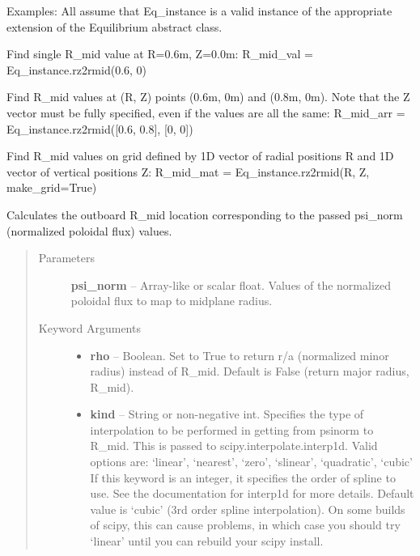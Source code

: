 \documentclass[letterpaper,10pt,english]{sphinxmanual}
\begin{document}
\begin{fulllineitems}
\begin{fulllineitems}
\begin{quote}
\begin{description}
\end{description}\end{quote}

Examples:
All assume that Eq\_instance is a valid instance of the appropriate
extension of the Equilibrium abstract class.

Find single R\_mid value at R=0.6m, Z=0.0m:
R\_mid\_val = Eq\_instance.rz2rmid(0.6, 0)

Find R\_mid values at (R, Z) points (0.6m, 0m) and (0.8m, 0m).
Note that the Z vector must be fully specified,
even if the values are all the same:
R\_mid\_arr = Eq\_instance.rz2rmid({[}0.6, 0.8{]}, {[}0, 0{]})

Find R\_mid values on grid defined by 1D vector of radial positions R
and 1D vector of vertical positions Z:
R\_mid\_mat = Eq\_instance.rz2rmid(R, Z, make\_grid=True)

\end{fulllineitems}


\begin{fulllineitems}
\label{eqtools:eqtools.eqdskreader.EqdskReader.psinorm2rmid}
Calculates the outboard R\_mid location corresponding to the passed psi\_norm (normalized poloidal flux) values.
\begin{quote}\begin{description}
\item[{Parameters }] \leavevmode
\textbf{psi\_norm} --
Array-like or scalar float. Values of the normalized
poloidal flux to map to midplane radius.

\item[{Keyword Arguments}] \leavevmode\begin{itemize}
\item {} 
\textbf{rho} --
Boolean. Set to True to return r/a (normalized minor radius)
instead of R\_mid. Default is False (return major radius, R\_mid).

\item {} 
\textbf{kind} --
String or non-negative int. Specifies the type of interpolation
to be performed in getting from psinorm to R\_mid. This is
passed to scipy.interpolate.interp1d. Valid options are:
`linear', `nearest', `zero', `slinear', `quadratic', `cubic'
If this keyword is an integer, it specifies the order of spline
to use. See the documentation for interp1d for more details.
Default value is `cubic' (3rd order spline interpolation). On
some builds of scipy, this can cause problems, in which case
you should try `linear' until you can rebuild your scipy install.


\end{itemize}
\end{description}
\end{quote}
\end{fulllineitems}
\end{fulllineitems}
\end{document}
